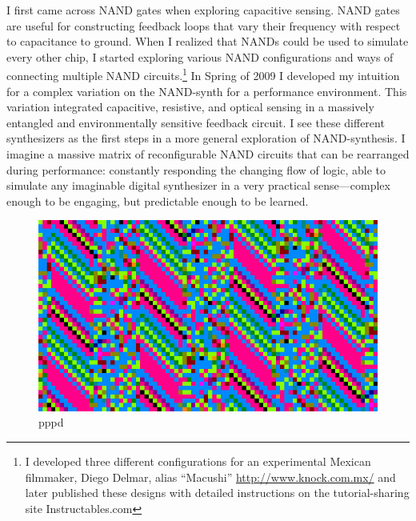 \documentclass{thesis}
\begin{document}
I first came across NAND gates when exploring capacitive sensing. NAND gates are useful for constructing feedback loops that vary their frequency with respect to capacitance to ground. When I realized that NANDs could be used to simulate every other chip, I started exploring various NAND configurations and ways of connecting multiple NAND circuits.\footnote{I developed three different configurations for an experimental Mexican filmmaker, Diego Delmar, alias ``Macushi'' \url{http://www.knock.com.mx/} and later published these designs with detailed instructions on the tutorial-sharing site Instructables.com} In Spring of 2009 I developed my intuition for a complex variation on the NAND-synth for a performance environment. This variation integrated capacitive, resistive, and optical sensing in a massively entangled and environmentally sensitive feedback circuit. I see these different synthesizers as the first steps in a more general exploration of NAND-synthesis. I imagine a massive matrix of reconfigurable NAND circuits that can be rearranged during performance: constantly responding the changing flow of logic, able to simulate any imaginable digital synthesizer in a very practical sense---complex enough to be engaging, but predictable enough to be learned.

\begin{figure}
	\begin{center}
		\includegraphics[scale=.5]{graphics/pppd.png}
		\caption{pppd}
	\end{center}
\end{figure}
\end{document}
